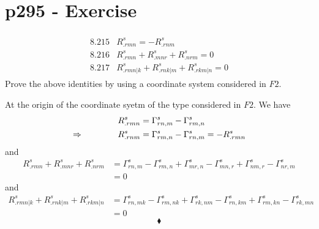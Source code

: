 \section{p295 - Exercise}
\begin{tcolorbox}
\begin{align*}
\begin{array}{ll}
\mathbf{8.215}& R^s_{.rmn} = -R^s_{.rnm}\\
\mathbf{8.216}& R^s_{.rmn} + R^s_{.mnr}+ R^s_{.nrm}=0\\
\mathbf{8.217}& R^s_{.rmn|k} + R^s_{.rnk|m}+ R^s_{.rkm|n}=0
\end{array}
\end{align*}
Prove the above identities by using a coordinate system considered in $F2$.
\end{tcolorbox}
 At the origin of the coordinate syetm of the type considered in $F2$. We have 
 \begin{align*}
 R^s_{.rmn}&= \Gamma^s_{rn,m}-\Gamma^s_{rm,n}\\
 \Rightarrow \quad\quad\quad\quad R^s_{.rnm}&= \Gamma^s_{rm,n}-\Gamma^s_{rn,m} = -R^s_{.rmn}
 \end{align*}
 and 
 \begin{align*}
 R^s_{.rmn} + R^s_{.mnr}+ R^s_{.nrm}&= \Gamma^s_{rn,m}-\Gamma^s_{rm,n} +\Gamma^s_{mr,n}-\Gamma^s_{mn,r} +\Gamma^s_{nm,r}-\Gamma^s_{nr,m} \\
 &=0
 \end{align*}
 and 
 \begin{align*}
 R^s_{.rmn|k} + R^s_{.rnk|m}+ R^s_{.rkm|n}&= \Gamma^s_{rn,mk}-\Gamma^s_{rm,nk} +\Gamma^s_{rk,nm}-\Gamma^s_{rn,km} +\Gamma^s_{rm,kn}-\Gamma^s_{rk,mn}\\
 &=0
 \end{align*}
$$\blacklozenge$$
\newpage

